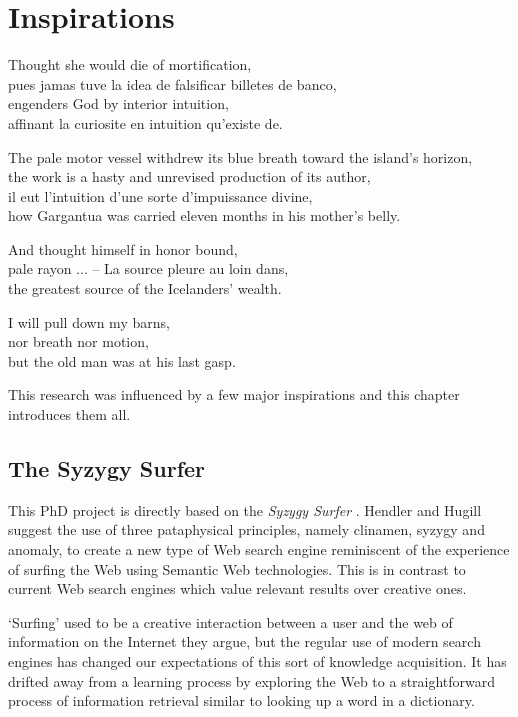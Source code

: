 
\chapter{Inspirations}
\label{ch:inspirations}

\startcontents[chapters]

\vfill

Thought she would die of mortification, \\
pues jamas tuve la idea de falsificar billetes de banco, \\
engenders God by interior intuition, \\
affinant la curiosite en intuition qu'existe de.

The pale motor vessel withdrew its blue breath toward the island's horizon, \\
the work is a hasty and unrevised production of its author, \\
il eut l'intuition d'une sorte d'impuissance divine, \\
how Gargantua was carried eleven months in his mother's belly.

And thought himself in honor bound, \\
pale rayon ... -- La source pleure au loin dans, \\
the greatest source of the Icelanders' wealth.

I will pull down my barns, \\
nor breath nor motion, \\
but the old man was at his last gasp.

\newpage
\minicontents
\spirals

This research was influenced by a few major inspirations and this chapter introduces them all.


\section{The Syzygy Surfer}

This PhD project is directly based on the \textit{Syzygy Surfer} \autocite{Hendler2011, Hendler2013}. Hendler and Hugill suggest the use of three pataphysical principles, namely clinamen, syzygy and anomaly, to create a new type of Web search engine reminiscent of the experience of surfing the Web using Semantic Web technologies. This is in contrast to current Web search engines which value relevant results over creative ones.

`Surfing' used to be a creative interaction between a user and the web of information on the Internet they argue, but the regular use of modern search engines has changed our expectations of this sort of knowledge acquisition. It has drifted away from a learning process by exploring the Web to a straightforward process of information retrieval similar to looking up a word in a dictionary.

